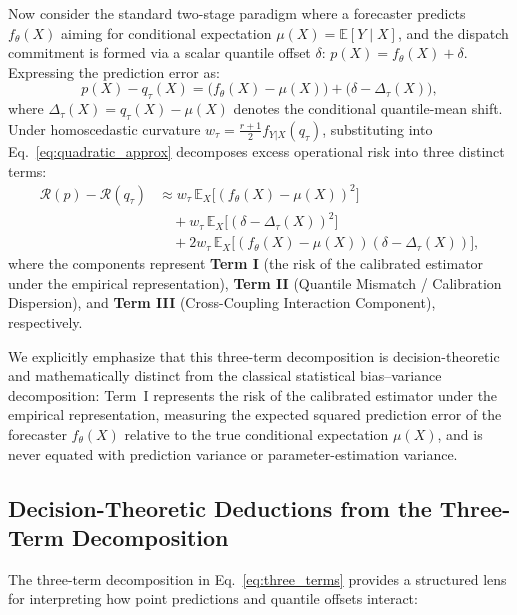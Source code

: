 Now consider the standard two-stage paradigm where a forecaster predicts $f_\theta(X)$ aiming for conditional expectation $\mu(X) = \mathbb{E}[Y \mid X]$, and the dispatch commitment is formed via a scalar quantile offset $\delta$: $p(X) = f_\theta(X) + \delta$. Expressing the prediction error as:
\begin{equation}
p(X) - q_\tau(X) = \big( f_\theta(X) - \mu(X) \big) + \big( \delta - \Delta_\tau(X) \big),
\end{equation}
where $\Delta_\tau(X) = q_\tau(X) - \mu(X)$ denotes the conditional quantile-mean shift. Under homoscedastic curvature $w_\tau = \frac{r+1}{2} f_{Y|X}(q_\tau)$, substituting into Eq.~\eqref{eq:quadratic_approx} decomposes excess operational risk into three distinct terms:
\begin{equation}
\begin{aligned}
\mathcal{R}(p) - \mathcal{R}(q_\tau) &\approx w_\tau \, \mathbb{E}_X \big[ (f_\theta(X) - \mu(X))^2 \big] \\
&\quad + w_\tau \, \mathbb{E}_X \big[ (\delta - \Delta_\tau(X))^2 \big] \\
&\quad + 2 w_\tau \, \mathbb{E}_X \big[ (f_\theta(X) - \mu(X))(\delta - \Delta_\tau(X)) \big],
\end{aligned}
\label{eq:three_terms}
\end{equation}
where the components represent \textbf{Term I} (the risk of the calibrated estimator under the empirical representation), \textbf{Term II} (Quantile Mismatch / Calibration Dispersion), and \textbf{Term III} (Cross-Coupling Interaction Component), respectively.

We explicitly emphasize that this three-term decomposition is decision-theoretic and mathematically distinct from the classical statistical bias--variance decomposition: Term~I represents the risk of the calibrated estimator under the empirical representation, measuring the expected squared prediction error of the forecaster $f_\theta(X)$ relative to the true conditional expectation $\mu(X)$, and is never equated with prediction variance or parameter-estimation variance.

\subsection{Decision-Theoretic Deductions from the Three-Term Decomposition}
The three-term decomposition in Eq.~\eqref{eq:three_terms} provides a structured lens for interpreting how point predictions and quantile offsets interact:

